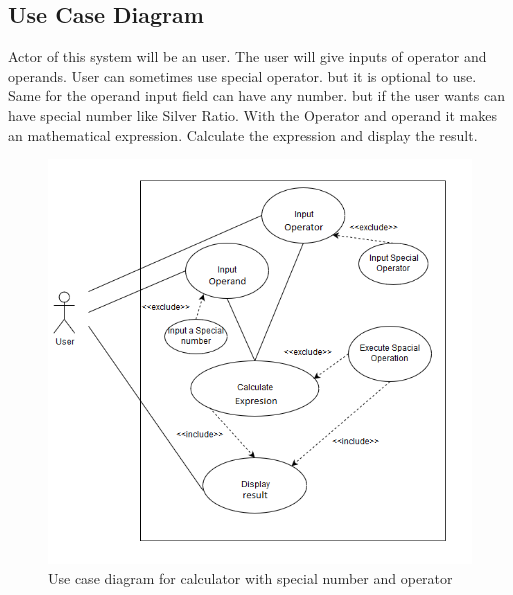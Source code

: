 \documentclass{article}
\begin{document}
\subsection{Use Case Diagram}
Actor of this system will be an user. The user will give inputs of operator and operands. User can sometimes use special operator. but it is optional to use. Same for the operand input field can have any number. but if the user wants can have special number like Silver Ratio. With the Operator and operand it makes an mathematical expression. Calculate the expression and display the result. 
\begin{figure}[ht!]
  
  \includegraphics[width=1\textwidth]{usecase}
  \centering
  \caption{Use case diagram for calculator with special number and operator}
\end{figure}
\end{document}
